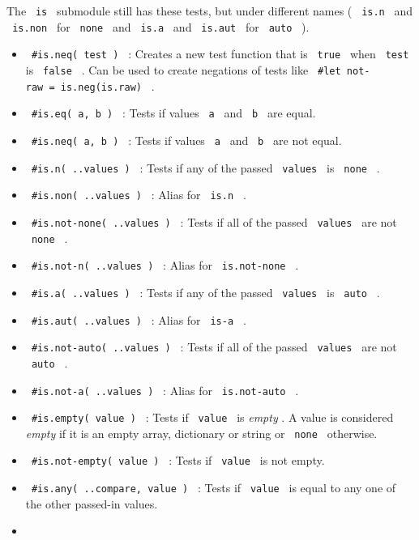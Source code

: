 The \texttt{\ is\ } submodule still has these tests, but under different
names ( \texttt{\ is.n\ } and \texttt{\ is.non\ } for \texttt{\ none\ }
and \texttt{\ is.a\ } and \texttt{\ is.aut\ } for \texttt{\ auto\ } ).

\begin{itemize}
\item
  \texttt{\ \#is.neq(\ test\ )\ } : Creates a new test function that is
  \texttt{\ true\ } when \texttt{\ test\ } is \texttt{\ false\ } . Can
  be used to create negations of tests like
  \texttt{\ \#let\ not-raw\ =\ is.neg(is.raw)\ } .
\item
  \texttt{\ \#is.eq(\ a,\ b\ )\ } : Tests if values \texttt{\ a\ } and
  \texttt{\ b\ } are equal.
\item
  \texttt{\ \#is.neq(\ a,\ b\ )\ } : Tests if values \texttt{\ a\ } and
  \texttt{\ b\ } are not equal.
\item
  \texttt{\ \#is.n(\ ..values\ )\ } : Tests if any of the passed
  \texttt{\ values\ } is \texttt{\ none\ } .
\item
  \texttt{\ \#is.non(\ ..values\ )\ } : Alias for \texttt{\ is.n\ } .
\item
  \texttt{\ \#is.not-none(\ ..values\ )\ } : Tests if all of the passed
  \texttt{\ values\ } are not \texttt{\ none\ } .
\item
  \texttt{\ \#is.not-n(\ ..values\ )\ } : Alias for
  \texttt{\ is.not-none\ } .
\item
  \texttt{\ \#is.a(\ ..values\ )\ } : Tests if any of the passed
  \texttt{\ values\ } is \texttt{\ auto\ } .
\item
  \texttt{\ \#is.aut(\ ..values\ )\ } : Alias for \texttt{\ is-a\ } .
\item
  \texttt{\ \#is.not-auto(\ ..values\ )\ } : Tests if all of the passed
  \texttt{\ values\ } are not \texttt{\ auto\ } .
\item
  \texttt{\ \#is.not-a(\ ..values\ )\ } : Alias for
  \texttt{\ is.not-auto\ } .
\item
  \texttt{\ \#is.empty(\ value\ )\ } : Tests if \texttt{\ value\ } is
  \emph{empty} . A value is considered \emph{empty} if it is an empty
  array, dictionary or string or \texttt{\ none\ } otherwise.
\item
  \texttt{\ \#is.not-empty(\ value\ )\ } : Tests if \texttt{\ value\ }
  is not empty.
\item
  \texttt{\ \#is.any(\ ..compare,\ value\ )\ } : Tests if
  \texttt{\ value\ } is equal to any one of the other passed-in values.
\item

\end{itemize}
